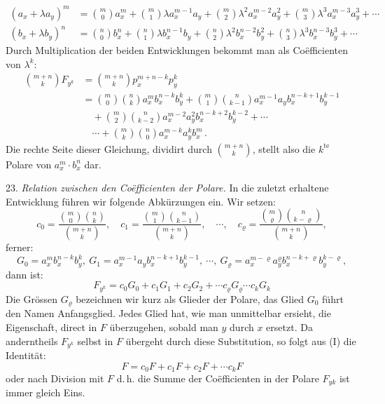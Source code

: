 \[
\begin{aligned}
(a_x+\lambda a_y)^m &= \binom{m}{0}a_x^m+\binom{m}{1}\lambda a_x^{m-1}a_y+\binom{m}{2}\lambda^2 a_x^{m-2}a_y^2+\binom{m}{3}\lambda^3 a_x^{m-3}a_y^3+\cdots\\
(b_x+\lambda b_y)^n &= \binom{n}{0}b_x^n+\binom{n}{1}\lambda b_x^{n-1}b_y+\binom{n}{2}\lambda^2 b_x^{n-2}b_y^2+\binom{n}{3}\lambda^3 b_x^{n-3}b_y^3+\cdots
\end{aligned}
\]
Durch Multiplication der beiden Entwicklungen bekommt man als Co\"efficienten von $\lambda^k$:
\[
\begin{aligned}
\binom{m+n}{k}F_{y^k} &= \binom{m+n}{k}p_x^{m+n-k}p_y^k\\
&= \binom{m}{0}\binom{n}{k}a_x^m b_x^{n-k}b_y^k+\binom{m}{1}\binom{n}{k-1}a_x^{m-1}a_y b_x^{n-k+1}b_y^{k-1}\\
&\quad+\binom{m}{2}\binom{n}{k-2}a_x^{m-2}a_y^2 b_x^{n-k+2}b_y^{k-2}+\cdots\\
&\quad\cdots+\binom{m}{k}\binom{n}{0}a_x^{m-k}a_y^k b_x^m\,.
\end{aligned}
\]
Die rechte Seite dieser Gleichung, dividirt durch $\binom{m+n}{k}$, stellt also die $k^{\text{te}}$ Polare von $a_x^m\cdot b_x^n$ dar.

23. \textit{Relation zwischen den Co\"efficienten der Polare.} In die zuletzt erhaltene Entwicklung führen wir folgende Abkürzungen ein. Wir setzen:
\[
c_0=\frac{\binom{m}{0}\binom{n}{k}}{\binom{m+n}{k}},\quad c_1=\frac{\binom{m}{1}\binom{n}{k-1}}{\binom{m+n}{k}},\quad\cdots,\quad c_\varrho=\frac{\binom{m}{\varrho}\binom{n}{k-\varrho}}{\binom{m+n}{k}},
\]
ferner:
\[
G_0=a_x^m b_x^{n-k}b_y^k,\ G_1=a_x^{m-1}a_y b_x^{n-k+1}b_y^{k-1},\ \cdots,\ G_\varrho=a_x^{m-\varrho}a_y^\varrho b_x^{n-k+\varrho}b_y^{k-\varrho},
\]
dann ist:
\[
F_{y^k}=c_0G_0+c_1G_1+c_2G_2+\cdots c_\varrho G_\varrho\cdots c_kG_k
\]
Die Grössen $G_\varrho$ bezeichnen wir kurz als \glqq Glieder\grqq{} der Polare, das Glied $G_0$ führt den Namen \glqq Anfangsglied\grqq{}. Jedes Glied hat, wie man unmittelbar ersieht, die Eigenschaft, direct in $F$ überzugehen, sobald man $y$ durch $x$ ersetzt. Da anderntheils $F_{y^k}$ selbst in $F$ übergeht durch diese Substitution, so folgt aus (I) die Identität:
\[
F=c_0F+c_1F+c_2F+\cdots c_kF
\]
oder nach Division mit $F$
d.\,h. \glqq die Summe der Co\"efficienten in der Polare $F_{yk}$ ist immer gleich Eins.\grqq{}

